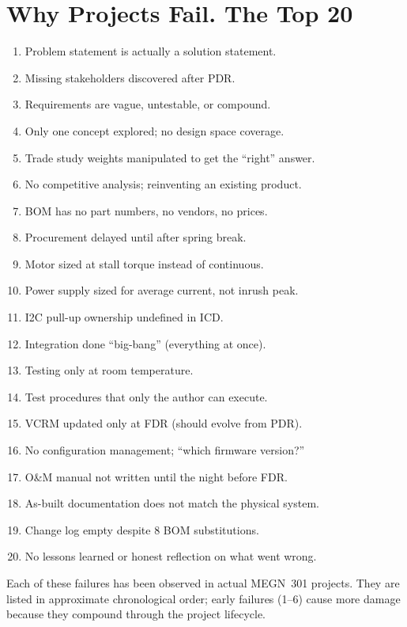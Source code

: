 \chapter*{Why Projects Fail. The Top 20}

\begin{enumerate}[leftmargin=1.5em]
\item Problem statement is actually a solution statement.
\item Missing stakeholders discovered after PDR.
\item Requirements are vague, untestable, or compound.
\item Only one concept explored; no design space coverage.
\item Trade study weights manipulated to get the ``right'' answer.
\item No competitive analysis; reinventing an existing product.
\item BOM has no part numbers, no vendors, no prices.
\item Procurement delayed until after spring break.
\item Motor sized at stall torque instead of continuous.
\item Power supply sized for average current, not inrush peak.
\item I2C pull-up ownership undefined in ICD.
\item Integration done ``big-bang'' (everything at once).
\item Testing only at room temperature.
\item Test procedures that only the author can execute.
\item VCRM updated only at FDR (should evolve from PDR).
\item No configuration management; ``which firmware version?''
\item O\&M manual not written until the night before FDR.
\item As-built documentation does not match the physical system.
\item Change log empty despite 8 BOM substitutions.
\item No lessons learned or honest reflection on what went wrong.
\end{enumerate}


Each of these failures has been observed in actual MEGN~301 projects. They are listed in approximate chronological order; early failures (1--6) cause more damage because they compound through the project lifecycle.

